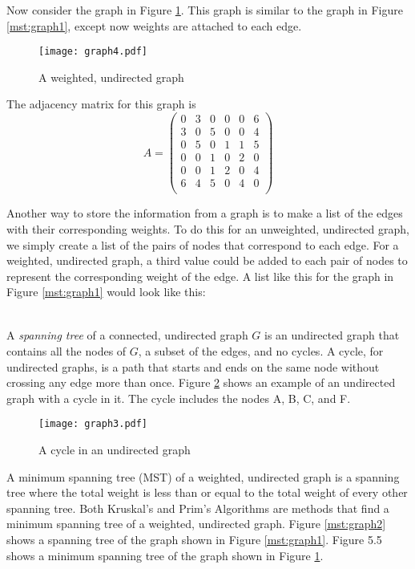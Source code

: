 Now consider the graph in Figure \ref{mst:graph4}.  This graph is similar to the graph in Figure \ref{mst:graph1}, except now weights are attached to each edge.  
\begin{figure}[H]
\texttt{[image: graph4.pdf]}
\caption{A weighted, undirected graph}
\label{mst:graph4}
\end{figure}

The adjacency matrix for this graph is 
\[
A = \begin{pmatrix}
0 & 3 & 0 & 0 & 0 & 6\\
3 & 0 & 5 & 0 & 0 & 4\\
0 & 5 & 0 & 1 & 1 & 5\\
0 & 0 & 1 & 0 & 2 & 0\\
0 & 0 & 1 & 2 & 0 & 4\\
6 & 4 & 5 & 0 & 4 & 0\\
\end{pmatrix}
\]

Another way to store the information from a graph is to make a list of the edges with their corresponding weights.
To do this for an unweighted, undirected graph, we simply create a list of the pairs of nodes that correspond to each edge.
For a weighted, undirected graph, a third value could be added to each pair of nodes to represent the corresponding weight of the edge.
A list like this for the graph in Figure \ref{mst:graph1} would look like this:

\begin{align*}
[('A', 'B'),
 ('B', 'C'),
 ('B', 'F'),
 ('C', 'D'),\\
 ('C', 'E'),
 ('C', 'F'),
 ('D', 'E'),
 ('E', 'F')]
\end{align*}

A \emph{spanning tree} of a connected, undirected graph $G$ is an undirected graph that contains all the nodes of $G$, a subset of the edges, and no cycles.
A cycle, for undirected graphs, is a path that starts and ends on the same node without crossing any edge more than once. Figure \ref{mst:graph3} shows an example of an undirected graph with a cycle in it. The cycle includes the nodes A, B, C, and F.

\begin{figure}[H]
\texttt{[image: graph3.pdf]}
\caption{A cycle in an undirected graph}
\label{mst:graph3}
\end{figure}

A minimum spanning tree (MST) of a weighted, undirected graph is a spanning tree where the total weight is less than or equal to the total weight of every other spanning tree.
Both Kruskal's and Prim's Algorithms are methods that find a minimum spanning tree of a weighted, undirected graph.
Figure \ref{mst:graph2} shows a spanning tree of the graph shown in Figure \ref{mst:graph1}.
Figure 5.5 shows a minimum spanning tree of the graph shown in Figure \ref{mst:graph4}.


